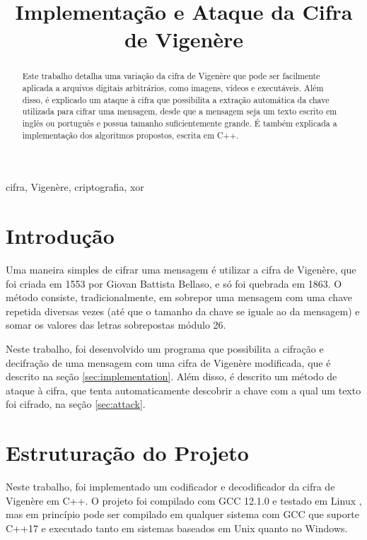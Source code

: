 \documentclass[conference]{IEEEtran}
\begin{document}
\title{Implementação e Ataque da Cifra de Vigenère}

\author{
}

\maketitle

\begin{abstract}
    Este trabalho detalha uma variação da cifra de Vigenère que pode ser
    facilmente aplicada a arquivos digitais arbitrários, como imagens, vídeos e
    executáveis. Além disso, é explicado um ataque à cifra que possibilita a
    extração automática da chave utilizada para cifrar uma mensagem, desde que a
    mensagem seja um texto escrito em inglês ou português e possua tamanho
    suficientemente grande. É também explicada a implementação dos algoritmos
    propostos, escrita em C++.
\end{abstract}

\begin{IEEEkeywords}
    cifra, Vigenère, criptografia, xor
\end{IEEEkeywords}

\section{Introdução} %
Uma maneira simples de cifrar uma mensagem é utilizar a cifra de Vigenère, que
foi criada em 1553 por Giovan Battista Bellaso, e só foi quebrada em 1863. O
método consiste, tradicionalmente, em sobrepor uma mensagem com uma chave
repetida diversas vezes (até que o tamanho da chave se iguale ao da mensagem) e
somar os valores das letras sobrepostas módulo 26.

Neste trabalho, foi desenvolvido um programa que possibilita a cifração e
decifração de uma mensagem com uma cifra de Vigenère modificada, que é
descrito na seção \ref{sec:implementation}. Além disso, é descrito um método de
ataque à cifra, que tenta automaticamente descobrir a chave com a qual um texto
foi cifrado, na seção \ref{sec:attack}.


\section{Estruturação do Projeto} %
Neste trabalho, foi implementado um codificador e decodificador da cifra de
Vigenère em C++. O projeto foi compilado com GCC 12.1.0 e testado em Linux , mas
em princípio pode ser compilado em qualquer sistema com GCC que suporte C++17 e
executado tanto em sistemas baseados em Unix quanto no Windows. 
\end{document}
